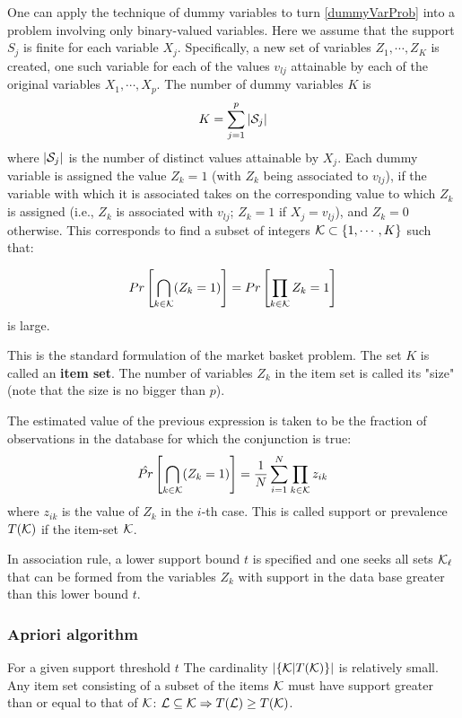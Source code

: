 One can apply the technique of dummy variables to turn \autoref{dummyVarProb} into a problem involving only binary-valued variables. Here we assume that the support $S_j$ is finite for each variable $X_j$. Specifically, a new set of variables $Z_1, \cdots, Z_K$ is created, one such variable for each of the values $v_{lj}$ attainable by each of the original variables $X_1, \cdots, X_p$. The number of dummy variables $K$ is
\begin{equation}
K = \sum_{j=1}^p |\CMcal{S}_j|
\end{equation}
where $|\CMcal{S}_j|$ is the number of distinct values attainable by $X_j$.  Each dummy variable is assigned the value $Z_k = 1$ (with $Z_k$ being associated to $v_{lj}$), if the variable with which it is associated takes on the corresponding value to which $Z_k$ is assigned (i.e., $Z_k$ is associated with $v_{lj}$; $Z_k = 1$ if  $X_j=v_{lj}$), and $Z_k = 0$ otherwise. This corresponds to find a subset of integers $\CMcal{K} \subset \{1,\cdots, K\}$ such that:

\begin{equation}
Pr\left[ \bigcap\limits_{k \in \CMcal{K}} \br{Z_k = 1}\right] = Pr\left[ \prod_{k \in \CMcal{K}} Z_k = 1\right]
\end{equation}
is large.

This is the standard formulation of the market basket problem. The set $K$ is called an \textbf{item set}. The number of variables $Z_k$ in the item set is called its "size" (note that the size is no bigger than $p$).

The estimated value of the previous expression is taken to be the fraction of observations in the database for which the conjunction is true:
\begin{equation}
\hat{Pr}\left[ \bigcap\limits_{k \in \CMcal{K}} \br{Z_k = 1}\right] = \frac{1}{N}\sum_{i=1}^N \prod_{k \in \CMcal{K}} z_{ik}
\end{equation}
where $z_{ik}$ is the value of $Z_k$ in the $i$-th case. This is called support or prevalence $T(\CMcal{K})$ if the item-set $\CMcal{K}$.

In association rule, a lower support bound $t$ is specified and one seeks all sets $\CMcal{K}_\ell$ that can be formed from the variables $Z_k$ with support in the data base greater than this lower bound $t$.

\subsubsection{Apriori algorithm}
For a given support threshold $t$ The cardinality $|\{\CMcal{K}| T(\CMcal{K}) \}|$ is relatively small. Any item set consisting of a subset of the items $\CMcal{K}$ must have support greater than or equal to that of  $\CMcal{K}$:  $\CMcal{L} \subseteq \CMcal{K} \Rightarrow T(\CMcal{L})\ge T(\CMcal{K})$.

